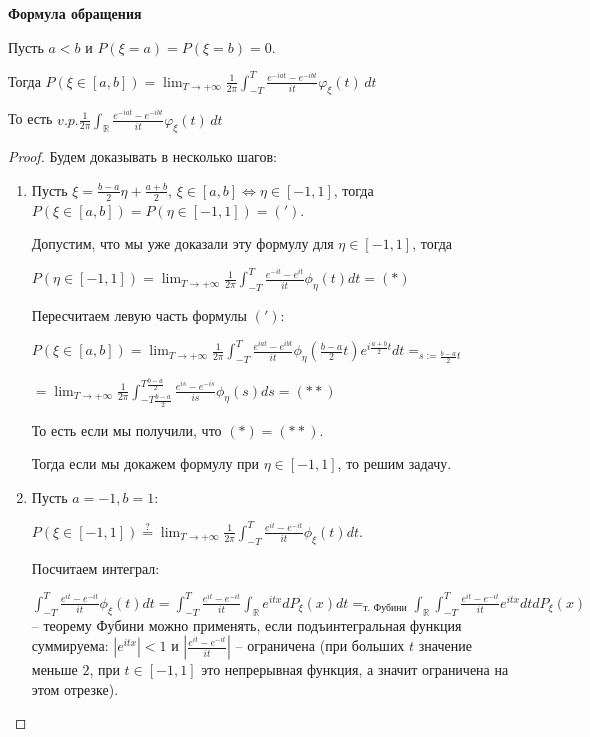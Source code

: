 \begin{theorem}
    \textbf{Формула обращения}

    Пусть $a < b$ и $P(\xi = a) = P(\xi = b) = 0$.

    Тогда $P(\xi \in [a, b]) = \lim_{T \to +\infty} \frac{1}{2\pi} \int_{-T}^{T} \frac{e^{-iat} - e^{-ibt}}{it} \varphi_{\xi}(t) \, dt $

    То есть $v.p. \frac{1}{2\pi} \int_{\mathbb{R}} \frac{e^{-iat} - e^{-ibt}}{it} \varphi_{\xi}(t) \, dt$
\end{theorem}

\begin{proof}

    Будем доказывать в несколько шагов:

    \begin{enumerate}
        \item {
            Пусть $\xi = \frac{b - a}{2} \eta + \frac{a +  b}{2}$, $\xi \in [a, b] \Leftrightarrow \eta \in [-1, 1]$, тогда $P(\xi \in [a, b]) = P(\eta \in [-1, 1]) = (')$.

            Допустим, что мы уже доказали эту формулу для $\eta \in [-1, 1]$, тогда

            $P(\eta \in [-1, 1]) = \lim_{T \to +\infty} \frac{1}{2\pi} \int_{-T}^{T} \frac{e^{-it} - e^{i t}}{it} \phi_{\eta}(t) dt = (*)$

            Пересчитаем левую часть формулы $(')$:

            $P(\xi \in [a, b]) = \lim_{T \to +\infty} \frac{1}{2\pi} \int_{-T}^{T} \frac{e^{i a t} - e^{i b t}}{i t} \phi_{\eta} (\frac{b - a}{2} t) e^{i \frac{a + b}{2} t} dt =_{s := \frac{b - a}{2} t}$

            $= \lim_{T \to +\infty} \frac{1}{2 \pi} \int_{-T \frac{b - a}{2}}^{T \frac{b - a}{2}} \frac{e^{i s} - e^{-i s}}{is} \phi_{\eta}(s) ds = (**)$

            То есть если мы получили, что $(*) = (**)$.

            Тогда если мы докажем формулу при $\eta \in [-1, 1]$, то решим задачу.
        }
        \item {
            Пусть $a = -1, b = 1$:

            $P(\xi \in [-1, 1]) \overset{?}{=} \lim_{T \to +\infty} \frac{1}{2\pi} \int_{-T}^{T} \frac{e^{it} - e^{-it}}{it} \phi_{\xi}(t) dt$.

            Посчитаем интеграл:

            $\int_{-T}^{T} \frac{e^{it} - e^{-it}}{it} \phi_{\xi}(t) dt = \int_{-T}^{T} \frac{e^{it} - e^{-it}}{it} \int_{\mathbb{R}} e^{itx} dP_{\xi}(x) dt =_{\text{т. Фубини}} \int_{\mathbb{R}} \int_{-T}^{T} \frac{e^{it} - e^{-it}}{it} e^{i t x} dt dP_{\xi}(x)$ -- теорему Фубини можно применять, если подъинтегральная функция суммируема: $|e^{i t x}| < 1$ и $|\frac{e^{it} - e^{-it}}{it}|$ -- ограничена (при больших $t$ значение меньше $2$, при $t \in [-1, 1]$ это непрерывная функция, а значит ограничена на этом отрезке).

}
\end{enumerate}
\end{proof}
